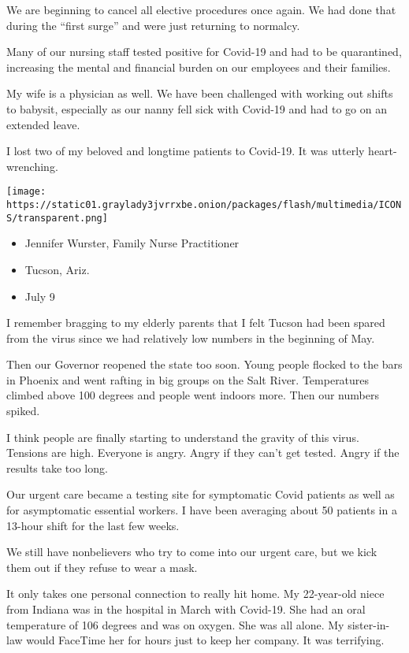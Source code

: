 We are beginning to cancel all elective procedures once again. We had
done that during the ``first surge'' and were just returning to
normalcy.

Many of our nursing staff tested positive for Covid-19 and had to be
quarantined, increasing the mental and financial burden on our employees
and their families.

My wife is a physician as well. We have been challenged with working out
shifts to babysit, especially as our nanny fell sick with Covid-19 and
had to go on an extended leave.

I lost two of my beloved and longtime patients to Covid-19. It was
utterly heart-wrenching.

\texttt{[image: https://static01.graylady3jvrrxbe.onion/packages/flash/multimedia/ICONS/transparent.png]}

\begin{itemize}
\tightlist
\item
  Jennifer Wurster, Family Nurse Practitioner
\item
  Tucson, Ariz.
\item
  July 9
\end{itemize}

I remember bragging to my elderly parents that I felt Tucson had been
spared from the virus since we had relatively low numbers in the
beginning of May.

Then our Governor reopened the state too soon. Young people flocked to
the bars in Phoenix and went rafting in big groups on the Salt River.
Temperatures climbed above 100 degrees and people went indoors more.
Then our numbers spiked.

I think people are finally starting to understand the gravity of this
virus. Tensions are high. Everyone is angry. Angry if they can't get
tested. Angry if the results take too long.

Our urgent care became a testing site for symptomatic Covid patients as
well as for asymptomatic essential workers. I have been averaging about
50 patients in a 13-hour shift for the last few weeks.

We still have nonbelievers who try to come into our urgent care, but we
kick them out if they refuse to wear a mask.

It only takes one personal connection to really hit home. My 22-year-old
niece from Indiana was in the hospital in March with Covid-19. She had
an oral temperature of 106 degrees and was on oxygen. She was all alone.
My sister-in-law would FaceTime her for hours just to keep her company.
It was terrifying.

